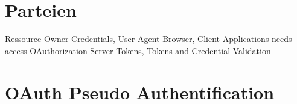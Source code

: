 \section{Parteien}
Ressource Owner {Credentials},
User Agent {Browser},
Client Applications {needs access}
OAuthorization Server {Tokens, Tokens and Credential-Validation}
    \blindtext{}

\section{OAuth Pseudo Authentification}

\blindtext{}
